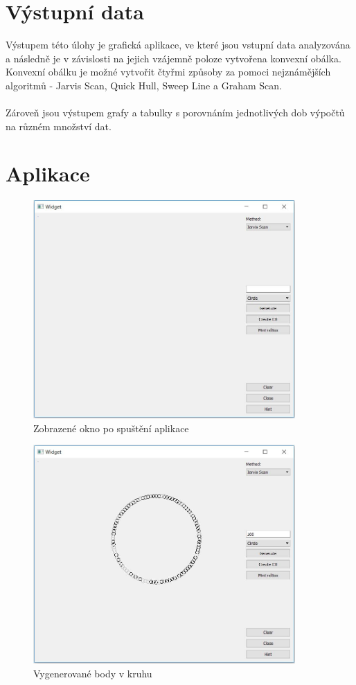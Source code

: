 \documentclass[a4paper, 12pt]{article}
\begin{document}
\section{Výstupní data}
Výstupem této úlohy je grafická aplikace, ve které jsou vstupní data analyzována a následně je v závislosti na jejich vzájemně poloze vytvořena konvexní obálka. Konvexní obálku je možné vytvořit čtyřmi způsoby za pomoci nejznámějších algoritmů - Jarvis Scan, Quick Hull, Sweep Line a Graham Scan.\\
\\
Zároveň jsou výstupem grafy a tabulky s porovnáním jednotlivých dob výpočtů na různém množství dat. 

\clearpage
\section{Aplikace}
\begin{figure}[h!]
	\centering
	\includegraphics[width=10cm]{vstup.jpg}
	\caption{Zobrazené okno po spuštění aplikace}
\end{figure}

\begin{figure}[h!]
	\centering
	\includegraphics[width=10cm]{circle.jpg}
	\caption{Vygenerované body v kruhu}
\end{figure}
\end{document}
